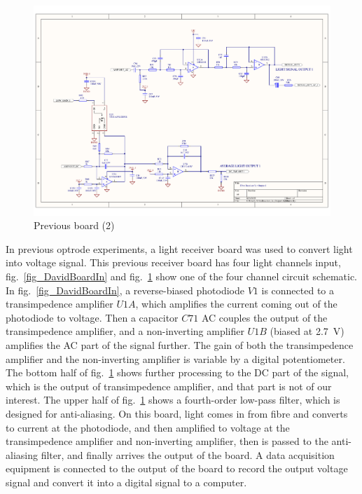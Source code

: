 \begin{figure}[h]
\centering
\includegraphics[width=0.9\linewidth]{4-ANC_Sys/FibreReceiver_3c_Output1.pdf}
\caption{Previous board (2)}
\label{fig_DavidBoardOut}
\end{figure}

In previous optrode experiments, a light receiver board was used to convert light into voltage signal.  This previous receiver board has four light channels input, fig.~\ref{fig_DavidBoardIn} and fig.~\ref{fig_DavidBoardOut} show one of the four channel circuit schematic.  In fig.~\ref{fig_DavidBoardIn}, a reverse-biased photodiode $V1$ is connected to a transimpedence amplifier $U1A$, which amplifies the current coming out of the photodiode to voltage.  Then a capacitor $C71$ AC couples the output of the transimpedence amplifier, and a non-inverting amplifier $U1B$ (biased at \qty{2.7}{V}) amplifies the AC part of the signal further.  The gain of both the transimpedence amplifier and the non-inverting amplifier is variable by a digital potentiometer.  The bottom half of fig.~\ref{fig_DavidBoardOut} shows further processing to the DC part of the signal, which is the output of transimpedence amplifier, and that part is not of our interest.  The upper half of fig.~\ref{fig_DavidBoardOut} shows a fourth-order low-pass filter, which is designed for anti-aliasing.  On this board, light comes in from fibre and converts to current at the photodiode, and then amplified to voltage at the transimpedence amplifier and non-inverting amplifier, then is passed to the anti-aliasing filter, and finally arrives the output of the board.  A data acquisition equipment is connected to the output of the board to record the output voltage signal and convert it into a digital signal to a computer.

